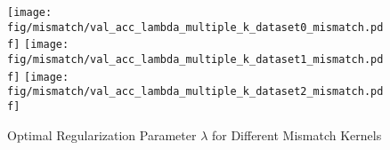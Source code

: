 \documentclass[final]{cvpr}
\begin{document}
	\newpage
	
	\begin{figure}[h!]
		\centering
		\texttt{[image: fig/mismatch/val\_acc\_lambda\_multiple\_k\_dataset0\_mismatch.pdf]}
		\texttt{[image: fig/mismatch/val\_acc\_lambda\_multiple\_k\_dataset1\_mismatch.pdf]}
		\texttt{[image: fig/mismatch/val\_acc\_lambda\_multiple\_k\_dataset2\_mismatch.pdf]}
		\caption{\centering Optimal Regularization Parameter $\lambda$ for Different Mismatch Kernels}
		\label{fig:lambda_mismatch}
	\end{figure}
		
\end{document}
